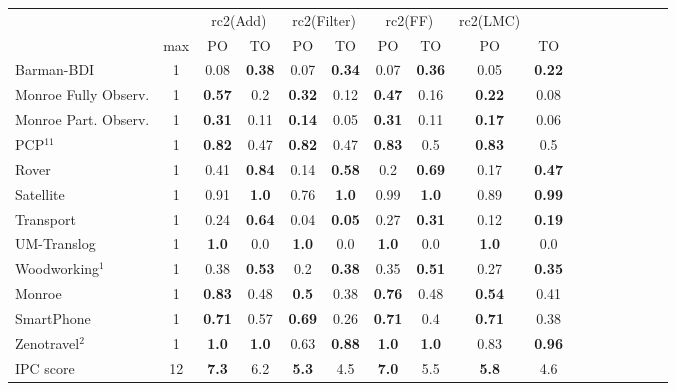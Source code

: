 \begin{tabular}{lccccccccccccccccl} 
\toprule 
  && \multicolumn{2}{c}{rc2(Add)} & \multicolumn{2}{c}{rc2(Filter)} & \multicolumn{2}{c}{rc2(FF)} & \multicolumn{2}{c}{rc2(LMC)} \\ 
\cmidrule(lr){3-4} \cmidrule(lr){5-6} \cmidrule(lr){7-8} \cmidrule(lr){9-10}  
 & max &PO & TO & PO & TO & PO & TO & PO &\multicolumn{2}{c}{ TO  } \\ 
\midrule 
Barman-BDI & 1 & 0.08 & \textbf{0.38} & 0.07 & \textbf{0.34} & 0.07 & \textbf{0.36} & 0.05 &\multicolumn{2}{c}{ \textbf{0.22}  } \\ 
Monroe Fully Observ. & 1 & \textbf{0.57} & 0.2 & \textbf{0.32} & 0.12 & \textbf{0.47} & 0.16 & \textbf{0.22} &\multicolumn{2}{c}{ 0.08  } \\ 
Monroe Part. Observ. & 1 & \textbf{0.31} & 0.11 & \textbf{0.14} & 0.05 & \textbf{0.31} & 0.11 & \textbf{0.17} &\multicolumn{2}{c}{ 0.06  } \\ 
PCP$^{11}$ & 1 & \textbf{0.82} & 0.47 & \textbf{0.82} & 0.47 & \textbf{0.83} & 0.5 & \textbf{0.83} &\multicolumn{2}{c}{ 0.5  } \\ 
Rover & 1 & 0.41 & \textbf{0.84} & 0.14 & \textbf{0.58} & 0.2 & \textbf{0.69} & 0.17 &\multicolumn{2}{c}{ \textbf{0.47}  } \\ 
Satellite & 1 & 0.91 & \textbf{1.0} & 0.76 & \textbf{1.0} & 0.99 & \textbf{1.0} & 0.89 &\multicolumn{2}{c}{ \textbf{0.99}  } \\ 
Transport & 1 & 0.24 & \textbf{0.64} & 0.04 & \textbf{0.05} & 0.27 & \textbf{0.31} & 0.12 &\multicolumn{2}{c}{ \textbf{0.19}  } \\ 
UM-Translog & 1 & \textbf{1.0} & 0.0 & \textbf{1.0} & 0.0 & \textbf{1.0} & 0.0 & \textbf{1.0} &\multicolumn{2}{c}{ 0.0  } \\ 
Woodworking$^{1}$ & 1 & 0.38 & \textbf{0.53} & 0.2 & \textbf{0.38} & 0.35 & \textbf{0.51} & 0.27 &\multicolumn{2}{c}{ \textbf{0.35}  } \\ 
\midrule 
 Monroe & 1 & \textbf{0.83} & 0.48 & \textbf{0.5} & 0.38 & \textbf{0.76} & 0.48 & \textbf{0.54} &\multicolumn{2}{c}{ 0.41  } \\ 
SmartPhone & 1 & \textbf{0.71} & 0.57 & \textbf{0.69} & 0.26 & \textbf{0.71} & 0.4 & \textbf{0.71} &\multicolumn{2}{c}{ 0.38  } \\ 
Zenotravel$^{2}$ & 1 & \textbf{1.0} & \textbf{1.0} & 0.63 & \textbf{0.88} & \textbf{1.0} & \textbf{1.0} & 0.83 &\multicolumn{2}{c}{ \textbf{0.96}  } \\ 
\midrule 
 IPC score & 12 & \textbf{7.3} & 6.2 & \textbf{5.3} & 4.5 & \textbf{7.0} & 5.5 & \textbf{5.8} &\multicolumn{2}{c}{ 4.6  } \\ 
\bottomrule 
 \end{tabular} 
